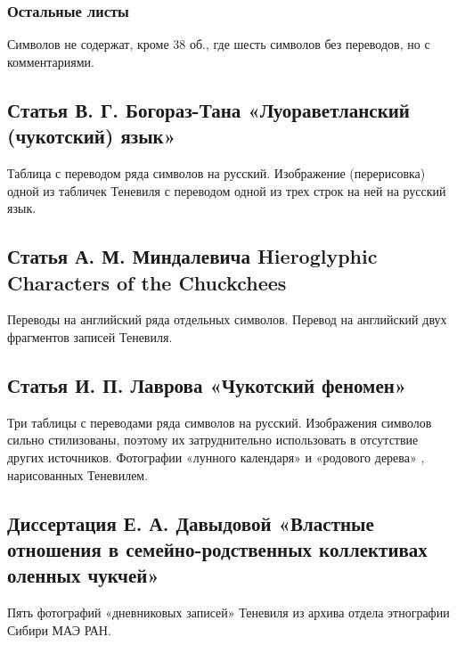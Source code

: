 \documentclass{article}
\newcounter{glyph}
\def\allchars{}
\begin{document}
\subsubsection{Остальные листы}

Символов не содержат, кроме 38 об., где шесть символов без переводов, но с комментариями.

\subsection{Статья В. Г. Богораз-Тана «Луораветланский (чукотский) язык»}

Таблица с переводом ряда символов на русский. Изображение (перерисовка) одной из табличек Теневиля с переводом одной из трех строк на ней на русский язык.

\subsection{Статья А. М. Миндалевича Hieroglyphic Characters of the Chuckchees}

Переводы на английский ряда отдельных символов. Перевод на английский двух фрагментов записей Теневиля.

\subsection{Статья И. П. Лаврова «Чукотский феномен»}

Три таблицы с переводами ряда символов на русский. Изображения символов сильно стилизованы, поэтому их затруднительно использовать в отсутствие других источников. Фотографии «лунного календаря» и «родового дерева» , нарисованных Теневилем.

\subsection{Диссертация Е. А. Давыдовой «Властные отношения в семейно-родственных коллективах оленных чукчей»}

Пять фотографий «дневниковых записей» Теневиля из архива отдела этнографии Сибири МАЭ РАН.

\printbibliography

\end{document}
